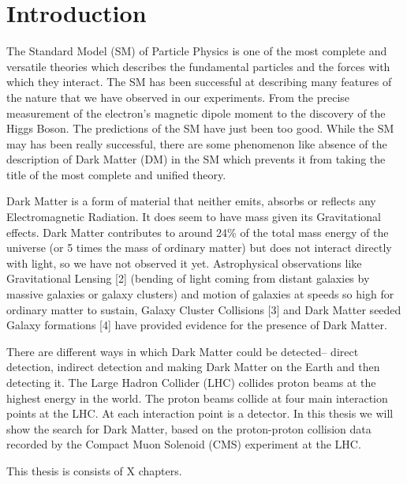 \chapter{Introduction}
\label{chapter:introduction}


The Standard Model (SM) of Particle Physics is one of the most complete and versatile theories which describes the fundamental particles and the forces with which they interact. The SM has been successful at describing many features of the nature that we have observed in our experiments. From the precise measurement of the electron's magnetic dipole moment to the discovery of the Higgs Boson. The predictions of the SM have just been too good. While the SM may has been really successful, there are some phenomenon like absence of the description of Dark Matter (DM) in the SM which prevents it from taking the title of the most complete and unified theory.

Dark Matter  is a form of material that neither emits, absorbs or reflects any Electromagnetic Radiation. It does seem to have mass given its Gravitational effects. Dark Matter contributes to around 24\% of the total mass energy of the universe (or 5 times the mass of ordinary matter) but does not interact directly with light, so we have not observed it yet. Astrophysical observations like Gravitational Lensing [2] (bending of light coming from distant galaxies by massive galaxies or galaxy clusters) and motion of galaxies at speeds so high for ordinary matter to sustain, Galaxy Cluster Collisions [3] and Dark Matter seeded Galaxy formations [4] have provided evidence for the presence of Dark Matter.

There are different ways in which Dark Matter could be detected-- direct detection, indirect detection and making Dark Matter on the Earth and then detecting it. The Large Hadron Collider (LHC) collides proton beams at the highest energy in the world. The proton beams collide at four main interaction points at the LHC. At each interaction point is a detector. In this thesis we will show the search for Dark Matter, based on the proton-proton collision data recorded by the Compact Muon Solenoid (CMS) experiment at the LHC.

This thesis is consists of X chapters. 


